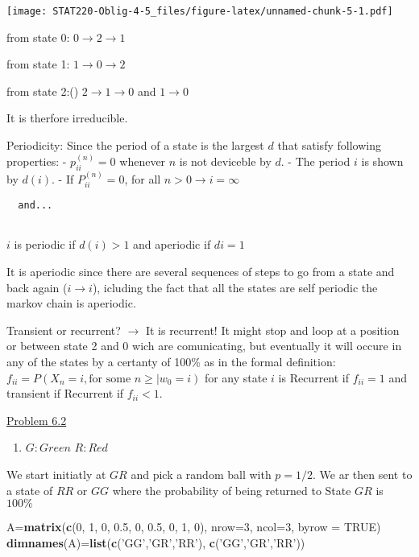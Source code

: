 \documentclass[]{article}
\newenvironment{Shaded}{\begin{snugshade}}{\end{snugshade}}
\newcommand{\DataTypeTok}[1]{\textcolor[rgb]{0.13,0.29,0.53}{#1}}
\newcommand{\DecValTok}[1]{\textcolor[rgb]{0.00,0.00,0.81}{#1}}
\newcommand{\FloatTok}[1]{\textcolor[rgb]{0.00,0.00,0.81}{#1}}
\newcommand{\KeywordTok}[1]{\textcolor[rgb]{0.13,0.29,0.53}{\textbf{#1}}}
\newcommand{\NormalTok}[1]{#1}
\newcommand{\OtherTok}[1]{\textcolor[rgb]{0.56,0.35,0.01}{#1}}
\newcommand{\StringTok}[1]{\textcolor[rgb]{0.31,0.60,0.02}{#1}}
\providecommand{\tightlist}{%
  \setlength{\itemsep}{0pt}\setlength{\parskip}{0pt}}
\begin{document}
\texttt{[image: STAT220-Oblig-4-5\_files/figure-latex/unnamed-chunk-5-1.pdf]}

from state 0: \(0\rightarrow 2\rightarrow 1\)

from state 1: \(1\rightarrow 0\rightarrow 2\)

from state 2:() \(2\rightarrow 1\rightarrow 0\) and \(1\rightarrow 0\)

It is therfore irreducible.

Periodicity: Since the period of a state is the largest \(d\) that
satisfy following properties: - \(p_{ii}^{(n)} = 0\) whenever \(n\) is
not deviceble by \(d\). - The period \(i\) is shown by \(d(i)\). - If
\(P_{ii}^{(n)} = 0\), for all \(n>0\rightarrow{i}=\infty\)

\begin{verbatim}
  and...
  
\end{verbatim}

\(i\) is periodic if \(d(i)>1\) and aperiodic if \(di=1\)

It is aperiodic since there are several sequences of steps to go from a
state and back again (\(i\rightarrow i\)), icluding the fact that all
the states are self periodic the markov chain is aperiodic.

Transient or recurrent? \(\rightarrow\) It is recurrent! It might stop
and loop at a position or between state 2 and 0 wich are comunicating,
but eventually it will occure in any of the states by a certanty of
100\% as in the formal definition:
\(f_{ii}=P(X_{n} = i, \textrm{for some } n\geq|w_{0}=i)\) for any state
\(i\) is Recurrent if \(f_{ii}=1\) and transient if Recurrent if
\(f_{ii}<1\).

\underline{Problem 6.2}

\begin{enumerate}
\def\labelenumi{\alph{enumi})}
\tightlist
\item
  \(G: Green\) \(R: Red\)
\end{enumerate}

We start initiatly at \(GR\) and pick a random ball with \(p=1/2\). We
ar then sent to a state of \(RR\) or \(GG\) where the probability of
being returned to State \(GR\) is \(100\%\)

\begin{Shaded}
\begin{Highlighting}[]
\NormalTok{A=}\KeywordTok{matrix}\NormalTok{(}\KeywordTok{c}\NormalTok{(}\DecValTok{0}\NormalTok{, }\DecValTok{1}\NormalTok{, }\DecValTok{0}\NormalTok{, }\FloatTok{0.5}\NormalTok{, }\DecValTok{0}\NormalTok{, }\FloatTok{0.5}\NormalTok{, }\DecValTok{0}\NormalTok{, }\DecValTok{1}\NormalTok{, }\DecValTok{0}\NormalTok{), }\DataTypeTok{nrow=}\DecValTok{3}\NormalTok{, }\DataTypeTok{ncol=}\DecValTok{3}\NormalTok{, }\DataTypeTok{byrow =} \OtherTok{TRUE}\NormalTok{)}
\KeywordTok{dimnames}\NormalTok{(A)=}\KeywordTok{list}\NormalTok{(}\KeywordTok{c}\NormalTok{(}\StringTok{'GG'}\NormalTok{,}\StringTok{'GR'}\NormalTok{,}\StringTok{'RR'}\NormalTok{), }\KeywordTok{c}\NormalTok{(}\StringTok{'GG'}\NormalTok{,}\StringTok{'GR'}\NormalTok{,}\StringTok{'RR'}\NormalTok{))}
\end{Highlighting}
\end{Shaded}
\end{document}
